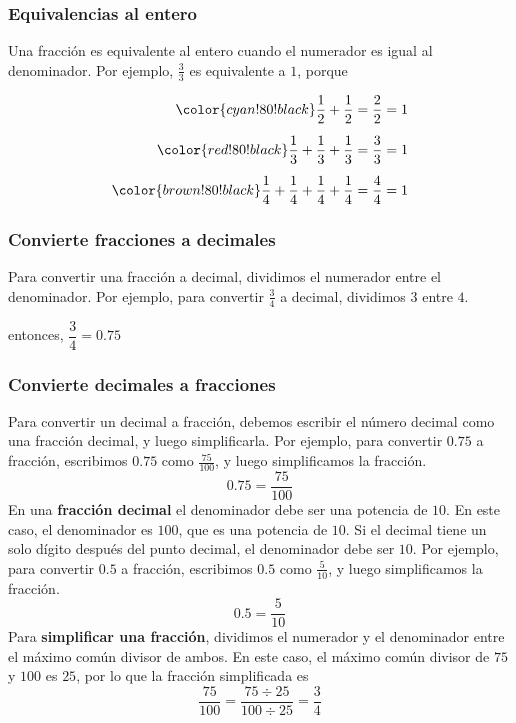 \subsubsection{Equivalencias al entero}
Una fracción es equivalente al entero cuando el numerador es igual al denominador. Por ejemplo, $\frac{3}{3}$ es equivalente a $1$, porque
\begin{multicols}{2}

    \begin{align*}
        \color{cyan!80!black}\dfrac{1}{2}+\dfrac{1}{2}                            & =\dfrac{2}{2}=1 \\[0.5em]
        \color{red!80!black}\dfrac{1}{3}+\dfrac{1}{3}+\dfrac{1}{3}                & =\dfrac{3}{3}=1 \\[0.5em]
        \color{brown!80!black}\dfrac{1}{4}+\dfrac{1}{4}+\dfrac{1}{4}+\dfrac{1}{4} & =\dfrac{4}{4}=1
    \end{align*}
\end{multicols}

\subsubsection{Convierte fracciones a decimales}
Para convertir una fracción a decimal, dividimos el numerador entre el denominador. Por ejemplo, para convertir $\frac{3}{4}$ a decimal, dividimos $3$ entre $4$.
\begin{center}
     \qquad entonces, $\dfrac{3}{4}=0.75$
\end{center}

\subsubsection{Convierte decimales a fracciones}
Para convertir un decimal a fracción, debemos escribir el número decimal como una fracción decimal, y luego simplificarla. Por ejemplo, para convertir $0.75$ a fracción, escribimos $0.75$ como $\frac{75}{100}$, y luego simplificamos la fracción.
\[0.75=\frac{75}{100}\]
En una \textbf{fracción decimal} el denominador debe ser una potencia de $10$. En este caso, el denominador es $100$, que es una potencia de $10$. Si el decimal tiene un solo dígito después del punto decimal, el denominador debe ser $10$. Por ejemplo, para convertir $0.5$ a fracción, escribimos $0.5$ como $\frac{5}{10}$, y luego simplificamos la fracción.
\[0.5=\frac{5}{10}\]
Para \textbf{simplificar una fracción}, dividimos el numerador y el denominador entre el máximo común divisor de ambos. En este caso, el máximo común divisor de $75$ y $100$ es $25$, por lo que la fracción simplificada es
\[\frac{75}{100}=\frac{75\div25}{100\div25}=\frac{3}{4}\]

